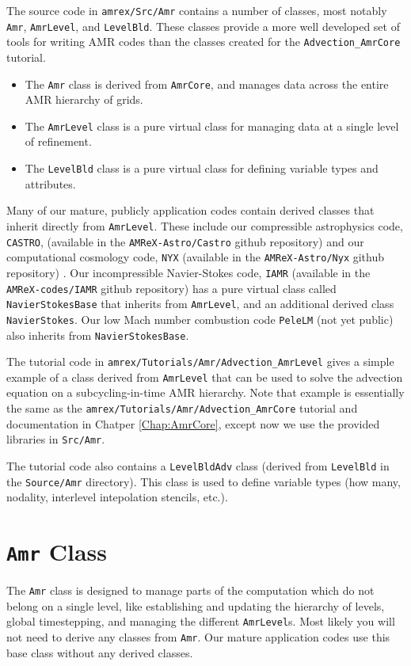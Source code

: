 The source code in {\tt amrex/Src/Amr} contains a number of classes, most notably
{\tt Amr}, {\tt AmrLevel}, and {\tt LevelBld}.
These classes provide a more well developed set of tools for writing AMR codes
than the classes created for the {\tt Advection\_AmrCore} tutorial.
\begin{itemize}
\item The {\tt Amr} class is derived from {\tt AmrCore}, and manages data across the 
entire AMR hierarchy of grids.
\item The {\tt AmrLevel} class is a pure virtual class for managing data at a
single level of refinement.
\item The {\tt LevelBld} class is a pure virtual class for defining variable types
and attributes.
\end{itemize}

Many of our mature, publicly application codes contain derived classes that inherit directly
from {\tt AmrLevel}.  These include our compressible astrophysics code,
{\tt CASTRO},
(available in the {\tt AMReX-Astro/Castro} github repository) 
 and our computational cosmology code, {\tt NYX}
(available in the {\tt AMReX-Astro/Nyx} github repository)   .
Our incompressible Navier-Stokes code, {\tt IAMR}
(available in the {\tt AMReX-codes/IAMR} github repository)
has a pure virtual class called {\tt NavierStokesBase} that inherits from {\tt AmrLevel},
and an additional derived class {\tt NavierStokes}.
Our low Mach number combustion code {\tt PeleLM} (not yet public) also inherits
from {\tt NavierStokesBase}.

The tutorial code in {\tt amrex/Tutorials/Amr/Advection\_AmrLevel} gives a simple
example of a class derived from {\tt AmrLevel} that can be used to solve
the advection equation on a subcycling-in-time AMR hierarchy.  Note that example
is essentially the same as the {\tt amrex/Tutorials/Amr/Advection\_AmrCore} tutorial
and documentation in Chatper \ref{Chap:AmrCore}, except now we use the provided
libraries in {\tt Src/Amr}.

The tutorial code also contains a {\tt LevelBldAdv} class (derived from {\tt LevelBld} in the
{\tt Source/Amr} directory).  This class is used to define variable types (how many, nodality,
interlevel intepolation stencils, etc.).

\section{{\tt Amr} Class}
The {\tt Amr} class is designed to manage parts of the computation  which do
not belong on a single level, like establishing and updating the hierarchy
of levels, global timestepping, and managing the different {\tt AmrLevel}s.
Most likely you will not need to derive any classes from {\tt Amr}.  Our mature
application codes use this base class without any derived classes.

